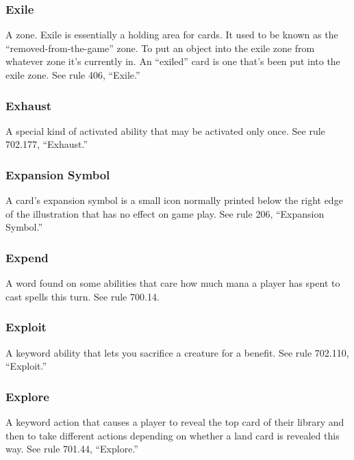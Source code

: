{{{{{{{{{\subsubsection*{Exile}

A zone. Exile is essentially a holding area for cards. It used to be known as the “removed-from-the-game” zone.
To put an object into the exile zone from whatever zone it’s currently in. An “exiled” card is one that’s been put into the exile zone.
See rule 406, “Exile.”

\subsubsection*{Exhaust}

A special kind of activated ability that may be activated only once. See rule 702.177, “Exhaust.”

\subsubsection*{Expansion Symbol}

A card’s expansion symbol is a small icon normally printed below the right edge of the illustration that has no effect on game play. See rule 206, “Expansion Symbol.”

\subsubsection*{Expend}

A word found on some abilities that care how much mana a player has spent to cast spells this turn. See rule 700.14.

\subsubsection*{Exploit}

A keyword ability that lets you sacrifice a creature for a benefit. See rule 702.110, “Exploit.”

\subsubsection*{Explore}

A keyword action that causes a player to reveal the top card of their library and then to take different actions depending on whether a land card is revealed this way. See rule 701.44, “Explore.”

}}}}}}}}}
